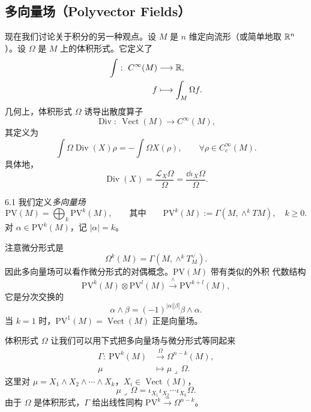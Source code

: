 \subsection{多向量场（Polyvector Fields）}

现在我们讨论关于积分的另一种观点。设 $M$ 是 $n$ 维定向流形（或简单地取
$\mathbb{R}^n$）。设 $\Omega$ 是 $M$ 上的体积形式。它定义了
\[
  \begin{aligned}
    \int:\ C^{\infty}(M)&\longrightarrow\mathbb{R},\\
    f&\longmapsto\int_M\Omega f.
  \end{aligned}
\]
几何上，体积形式 $\Omega$ 诱导出散度算子
\[
  \operatorname{Div}:\ \operatorname{Vect}(M)\longrightarrow C^{\infty}(M),
\]
其定义为
\[
  \int\Omega\operatorname{Div}(X)\rho
  =-\int\Omega X(\rho),\qquad \forall\rho\in C_c^{\infty}(M).
\]
具体地，
\[
  \operatorname{Div}(X)=\frac{\mathcal{L}_X\Omega}{\Omega}
  =\frac{\dd\iota_X\Omega}{\Omega}.
\]



\begin{wdefn}{6.1}
我们定义\emph{多向量场}
\[
  \mathrm{PV}(M)=\bigoplus_k \mathrm{PV}^k(M),
  \qquad\text{其中}\qquad
  \mathrm{PV}^k(M):=\Gamma(M,\wedge^k TM),\quad k\ge 0.
\]
对 $\alpha\in\mathrm{PV}^k(M)$，记 $|\alpha|=k$。
\end{wdefn}

注意微分形式是
\[
  \Omega^k(M)=\Gamma(M,\wedge^k T^{\vee}_M).
\]
因此多向量场可以看作微分形式的对偶概念。$\mathrm{PV}(M)$ 带有类似的外积
代数结构
\[
  \mathrm{PV}^k(M)\otimes\mathrm{PV}^l(M)
  \xrightarrow{\ \wedge\ }\mathrm{PV}^{k+l}(M),
\]
它是分次交换的
\[
  \alpha\wedge\beta=(-1)^{|\alpha||\beta|}\beta\wedge\alpha.
\]
当 $k=1$ 时，$\mathrm{PV}^1(M)=\operatorname{Vect}(M)$ 正是向量场。

体积形式 $\Omega$ 让我们可以用下式把多向量场与微分形式等同起来
\[
  \begin{aligned}
    \Gamma:\ \mathrm{PV}^k(M)&\xrightarrow{\ \Omega\ }\Omega^{n-k}(M),\\
    \mu&\longmapsto\mu\lrcorner\,\Omega.
  \end{aligned}
\]
这里对 $\mu=X_1\wedge X_2\wedge\cdots\wedge X_k$，$X_i\in\operatorname{Vect}(M)$，
\[
  \mu\lrcorner\,\Omega=\iota_{X_1}\iota_{X_2}\cdots\iota_{X_k}\Omega.
\]
由于 $\Omega$ 是体积形式，$\Gamma$ 给出线性同构
$\mathrm{PV}^k\overset{\simeq}{\longrightarrow}\Omega^{n-k}$。

